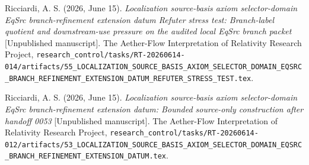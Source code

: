 \documentclass[11pt]{article}
\begin{document}
Ricciardi, A. S. (2026, June 15). \emph{Localization source-basis axiom
selector-domain EqSrc branch-refinement extension datum Refuter stress
test: Branch-label quotient and downstream-use pressure on the audited
local EqSrc branch packet} [Unpublished manuscript]. The Aether-Flow
Interpretation of Relativity Research Project,
\texttt{research\_control/tasks/RT-20260614-014/artifacts/55\_LOCALIZATION\_SOURCE\_BASIS\_AXIOM\_SELECTOR\_DOMAIN\_EQSRC\_BRANCH\_REFINEMENT\_EXTENSION\_DATUM\_REFUTER\_STRESS\_TEST.tex}.

Ricciardi, A. S. (2026, June 15). \emph{Localization source-basis axiom
selector-domain EqSrc branch-refinement extension datum: Bounded
source-only construction after handoff 0053} [Unpublished manuscript].
The Aether-Flow Interpretation of Relativity Research Project,
\texttt{research\_control/tasks/RT-20260614-012/artifacts/53\_LOCALIZATION\_SOURCE\_BASIS\_AXIOM\_SELECTOR\_DOMAIN\_EQSRC\_BRANCH\_REFINEMENT\_EXTENSION\_DATUM.tex}.
\end{document}
